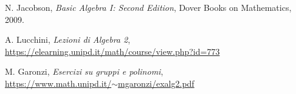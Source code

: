 \cleardoublepage
{}
{}
\begin{thebibliography}{9}
	
	N. Jacobson, 
	\emph{Basic Algebra I: Second Edition}, Dover Books on Mathematics, 2009.
	
	A. Lucchini,
	\emph{Lezioni di Algebra 2}, \\
	\href{https://elearning.unipd.it/math/course/view.php?id=773}{https://elearning.unipd.it/math/course/view.php?id=773}
	
	M. Garonzi,
	\emph{Esercizi su gruppi e polinomi}, \\ \href{https://www.math.unipd.it/~mgaronzi/exalg2.pdf}{https://www.math.unipd.it/$\sim$mgaronzi/exalg2.pdf}
	
\end{thebibliography}